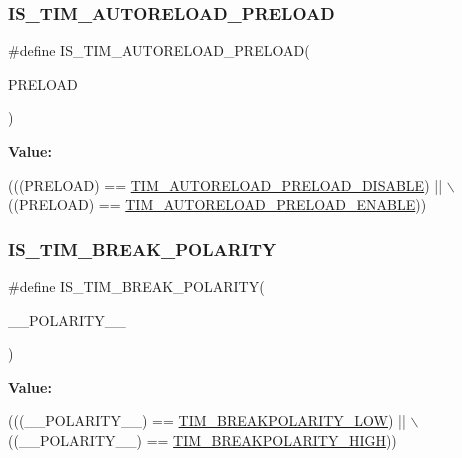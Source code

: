 \subsubsection{\texorpdfstring{I\+S\+\_\+\+T\+I\+M\+\_\+\+A\+U\+T\+O\+R\+E\+L\+O\+A\+D\+\_\+\+P\+R\+E\+L\+O\+AD}{IS\_TIM\_AUTORELOAD\_PRELOAD}}
{\footnotesize\ttfamily \#define I\+S\+\_\+\+T\+I\+M\+\_\+\+A\+U\+T\+O\+R\+E\+L\+O\+A\+D\+\_\+\+P\+R\+E\+L\+O\+AD(\begin{DoxyParamCaption}\item[{}]{P\+R\+E\+L\+O\+AD }\end{DoxyParamCaption})}

{\bfseries Value\+:}
\begin{DoxyCode}
(((PRELOAD) == \hyperlink{group___t_i_m___auto_reload_preload_ga4d0cf7e2800d0ab10f3f0ebfac11c9c7}{TIM\_AUTORELOAD\_PRELOAD\_DISABLE}) || \(\backslash\)
                                            ((PRELOAD) == 
      \hyperlink{group___t_i_m___auto_reload_preload_gaaa36f0c74b1d1ec83b0c105bfedfa309}{TIM\_AUTORELOAD\_PRELOAD\_ENABLE}))
\end{DoxyCode}
\mbox{\label{group___t_i_m___private___macros_ga42d1d6f041253c2a07ddee8d4411e2db}} 
\subsubsection{\texorpdfstring{I\+S\+\_\+\+T\+I\+M\+\_\+\+B\+R\+E\+A\+K\+\_\+\+P\+O\+L\+A\+R\+I\+TY}{IS\_TIM\_BREAK\_POLARITY}}
{\footnotesize\ttfamily \#define I\+S\+\_\+\+T\+I\+M\+\_\+\+B\+R\+E\+A\+K\+\_\+\+P\+O\+L\+A\+R\+I\+TY(\begin{DoxyParamCaption}\item[{}]{\+\_\+\+\_\+\+P\+O\+L\+A\+R\+I\+T\+Y\+\_\+\+\_\+ }\end{DoxyParamCaption})}

{\bfseries Value\+:}
\begin{DoxyCode}
(((\_\_POLARITY\_\_) == \hyperlink{group___t_i_m___break___polarity_ga3e07cb0376c1bf561341dc8befb66208}{TIM\_BREAKPOLARITY\_LOW}) || \(\backslash\)
                                             ((\_\_POLARITY\_\_) == 
      \hyperlink{group___t_i_m___break___polarity_ga97c30f1134accd61e3e42ce37e472700}{TIM\_BREAKPOLARITY\_HIGH}))
\end{DoxyCode}
\mbox{\label{group___t_i_m___private___macros_ga74dc07721b4a34a59194df534fb5fdd8}} 
